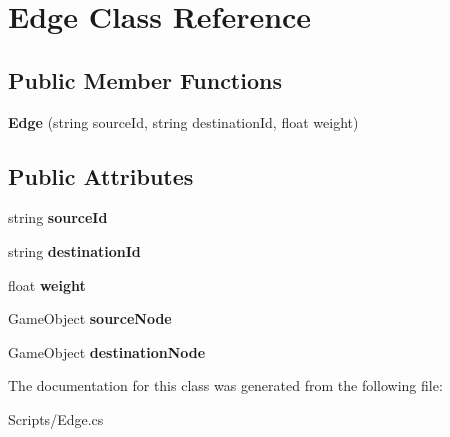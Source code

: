 \hypertarget{class_edge}{}\section{Edge Class Reference}
\label{class_edge}
\subsection*{Public Member Functions}
\begin{DoxyCompactItemize}
\item 
\mbox{\label{class_edge_a1867587ded1c86a8a25522c439cc0819}} 
{\bfseries Edge} (string source\+Id, string destination\+Id, float weight)
\end{DoxyCompactItemize}
\subsection*{Public Attributes}
\begin{DoxyCompactItemize}
\item 
\mbox{\label{class_edge_a5c34f3dea56d5a6cf779e5bc5ed66a0a}} 
string {\bfseries source\+Id}
\item 
\mbox{\label{class_edge_af391fb185ebf63f9fbe739fc4a9dce96}} 
string {\bfseries destination\+Id}
\item 
\mbox{\label{class_edge_a636623fec3bbf96668dc83eac1d5372e}} 
float {\bfseries weight}
\item 
\mbox{\label{class_edge_a1892e746667498d01636a6b43f61d60d}} 
Game\+Object {\bfseries source\+Node}
\item 
\mbox{\label{class_edge_ad1a278a3150479e7e3aada20f6cf70a5}} 
Game\+Object {\bfseries destination\+Node}
\end{DoxyCompactItemize}


The documentation for this class was generated from the following file\+:\begin{DoxyCompactItemize}
\item 
Scripts/Edge.\+cs\end{DoxyCompactItemize}
